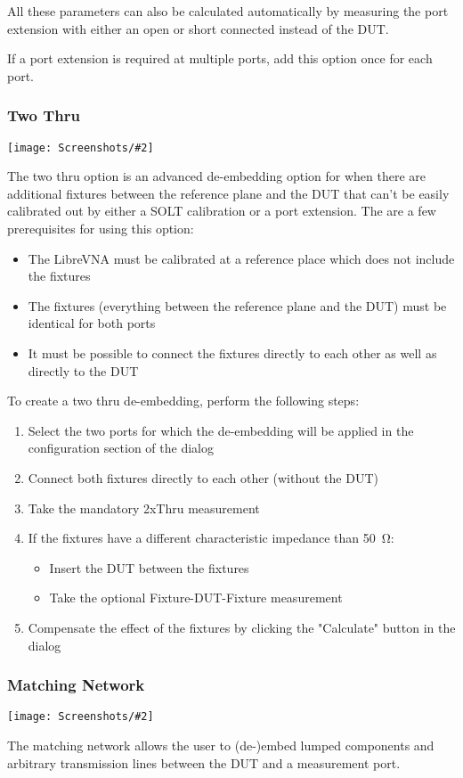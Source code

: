 \documentclass[a4paper,11pt]{article}
\newcommand{\vna}{LibreVNA}
\newcommand{\screenshot}[2]{\begin{center}
\texttt{[image: Screenshots/\#2]}
\end{center}}
\begin{document}
All these parameters can also be calculated automatically by measuring the port extension with either an open or short connected instead of the DUT.

If a port extension is required at multiple ports, add this option once for each port.

\subsubsection{Two Thru}
\screenshot{1.0}{DeembeddingTwoThru.png}
The two thru option is an advanced de-embedding option for when there are additional fixtures between the reference plane and the DUT that can't be easily calibrated out by either a SOLT calibration or a port extension. The are a few prerequisites for using this option:
\begin{itemize}
\item The \vna{} must be calibrated at a reference place which does not include the fixtures
\item The fixtures (everything between the reference plane and the DUT) must be identical for both ports
\item It must be possible to connect the fixtures directly to each other as well as directly to the DUT
\end{itemize}
\vspace{0.5cm}
To create a two thru de-embedding, perform the following steps:
\begin{enumerate}
\item Select the two ports for which the de-embedding will be applied in the configuration section of the dialog
\item Connect both fixtures directly to each other (without the DUT)
\item Take the mandatory 2xThru measurement
\item If the fixtures have a different characteristic impedance than \SI{50}{\ohm}:
\begin{itemize}
\item Insert the DUT between the fixtures
\item Take the optional Fixture-DUT-Fixture measurement
\end{itemize}
\item Compensate the effect of the fixtures by clicking the "Calculate" button in the dialog
\end{enumerate}

\subsubsection{Matching Network}
\screenshot{1.0}{DeembeddingMatchingNetwork.png}
The matching network allows the user to (de-)embed lumped components and arbitrary transmission lines between the DUT and a measurement port.
\end{document}
